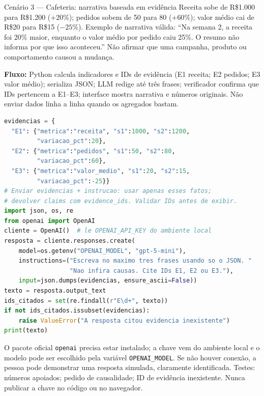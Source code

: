 \documentclass[10pt,a4paper]{article}
\begin{document}
\begin{chave}{Cenário 3 --- Cafeteria: narrativa baseada em evidência}
Receita sobe de R\$1.000 para R\$1.200 ($+20\%$); pedidos sobem de 50 para 80 ($+60\%$); valor médio cai de R\$20 para R\$15 ($-25\%$). Exemplo de narrativa válida: ``Na semana 2, a receita foi 20\% maior, enquanto o valor médio por pedido caiu 25\%. O resumo não informa por que isso aconteceu.'' Não afirmar que uma campanha, produto ou comportamento causou a mudança.

\textbf{Fluxo:} Python calcula indicadores e IDs de evidência (E1 receita; E2 pedidos; E3 valor médio); serializa JSON; LLM redige até três frases; verificador confirma que IDs pertencem a E1--E3; interface mostra narrativa e números originais. Não enviar dados linha a linha quando os agregados bastam.

\begin{lstlisting}[language=Python]
evidencias = {
  "E1": {"metrica":"receita", "s1":1000, "s2":1200,
         "variacao_pct":20},
  "E2": {"metrica":"pedidos", "s1":50, "s2":80,
         "variacao_pct":60},
  "E3": {"metrica":"valor_medio", "s1":20, "s2":15,
         "variacao_pct":-25}}
# Enviar evidencias + instrucao: usar apenas esses fatos;
# devolver claims com evidence_ids. Validar IDs antes de exibir.
import json, os, re
from openai import OpenAI
cliente = OpenAI()  # le OPENAI_API_KEY do ambiente local
resposta = cliente.responses.create(
    model=os.getenv("OPENAI_MODEL", "gpt-5-mini"),
    instructions=("Escreva no maximo tres frases usando so o JSON. "
                  "Nao infira causas. Cite IDs E1, E2 ou E3."),
    input=json.dumps(evidencias, ensure_ascii=False))
texto = resposta.output_text
ids_citados = set(re.findall(r"E\d+", texto))
if not ids_citados.issubset(evidencias):
    raise ValueError("A resposta citou evidencia inexistente")
print(texto)
\end{lstlisting}
O pacote oficial \texttt{openai} precisa estar instalado; a chave vem do ambiente local e o modelo pode ser escolhido pela variável \texttt{OPENAI\_MODEL}. Se não houver conexão, a pessoa pode demonstrar uma resposta simulada, claramente identificada. Testes: números apoiados; pedido de causalidade; ID de evidência inexistente. Nunca publicar a chave no código ou no navegador.
\end{chave}
\end{document}
